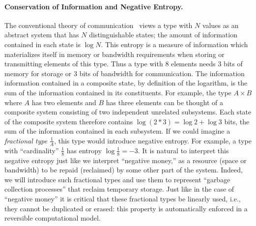 \documentclass[sigplan,10pt,review,anonymous]{acmart}
\begin{document}
\paragraph*{Conservation of Information and Negative Entropy.}
The conventional theory of
communication~\cite{Shannon1948} views a type with $N$ values as
an abstract system that has $N$ distinguishable states; the
amount of information contained in each state is $\log{N}$. This
entropy is a measure of information which materializes itself in
memory or bandwidth requirements when storing or transmitting elements
of this type. Thus a type with 8 elements needs 3 bits of memory for
storage or 3 bits of bandwidth for communication. The information
information contained in a composite state, by definition of the
logarithm, is the sum of
the information contained in its constituents. For example, the type
$A \times B$ where $A$ has two elements and $B$ has three elements can
be thought of a composite system consisting of two independent
unrelated subsystems.  Each state of the composite system therefore
contains $\log{(2*3)} = \log{2} + \log{3}$ bits, the sum of
the information contained in each subsystem. If we could imagine a
\emph{fractional type} $\frac{1}{A}$, this type would introduce
negative entropy. For example, a type with ``cardinality''
$\frac{1}{8}$ has entropy $\log{\frac{1}{8}} = -3$. It is natural to
interpret this negative entropy just like we interpret ``negative
money,'' as a resource (space or bandwidth) to be repaid (reclaimed)
by some other part of the system. Indeed, we will introduce such
fractional types and use them to represent ``garbage collection
processes'' that reclaim temporary storage. Just like in the case of
``negative money'' it is critical that these fractional types be
linearly used, i.e., they cannot be duplicated or erased: this
property is automatically enforced in a reversible
computational model.
\end{document}
